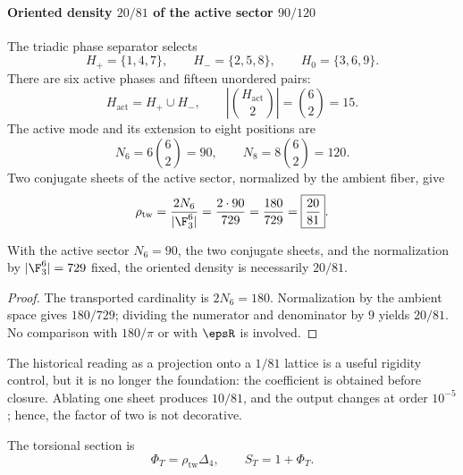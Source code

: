 
\paragraph{Oriented density \(20/81\) of the active sector \(90/120\)}

The triadic phase separator selects
\[
H_+=\{1,4,7\},\qquad H_-=\{2,5,8\},\qquad H_0=\{3,6,9\}.
\]
There are six active phases and fifteen unordered pairs:
\[
H_{\mathrm{act}}=H_+\cup H_-,\qquad
\left|\binom{H_{\mathrm{act}}}2\right|=\binom62=15.
\]
The active mode and its extension to eight positions are
\begin{equation}
N_6=6\binom62=90,\qquad
N_8=8\binom62=120.
\label{eq:90-120-incidencia}
\end{equation}
Two conjugate sheets of the active sector, normalized by the ambient fiber,
give
\begin{equation}
\rho_{\mathrm{tw}}
=\frac{2N_6}{|\F_3^6|}
=\frac{2\cdot90}{729}
=\frac{180}{729}
=\boxed{\frac{20}{81}}.
\label{eq:rho-twoway}
\end{equation}

\begin{proposition}
With the active sector \(N_6=90\), the two conjugate sheets, and the
normalization by \(|\F_3^6|=729\) fixed, the oriented density is necessarily
\(20/81\).
\end{proposition}
\begin{proof}
The transported cardinality is \(2N_6=180\). Normalization by the ambient space
gives \(180/729\); dividing the numerator and denominator by \(9\) yields \(20/81\).
No comparison with \(180/\pi\) or with \(\epsR\) is involved.
\end{proof}

The historical reading as a projection onto a \(1/81\) lattice is a useful rigidity control, but it is no longer the foundation: the coefficient is obtained before closure. Ablating one sheet produces \(10/81\), and the output changes at order \(10^{-5}\); hence, the factor of two is not decorative.

The torsional section is
\begin{equation}
\Phi_T=\rho_{\mathrm{tw}}\Delta_4,
\qquad
S_T=1+\Phi_T.
\label{eq:seccion-torsional}
\end{equation}

